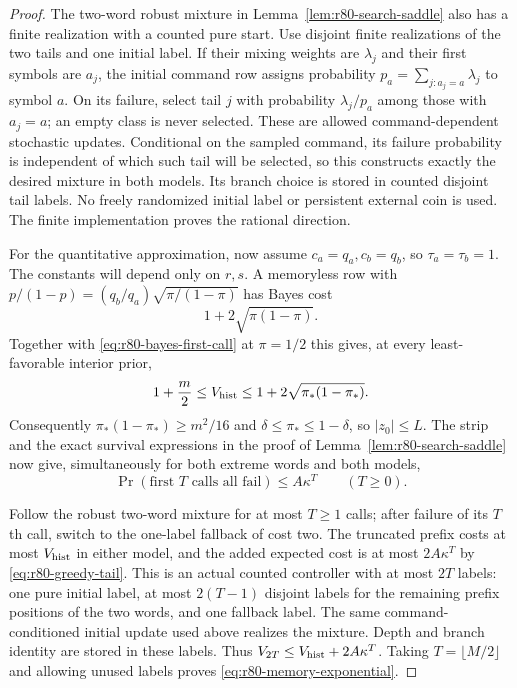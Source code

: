 \begin{proof}
The two-word robust mixture in
Lemma~\ref{lem:r80-search-saddle} also has a finite realization
with a counted pure start.  Use disjoint finite realizations of
the two tails and one initial label.  If their mixing weights
are $\lambda_j$ and their first symbols are $a_j$, the initial
command row assigns probability
$p_a=\sum_{j:a_j=a}\lambda_j$ to symbol $a$.  On its failure,
select tail $j$ with probability $\lambda_j/p_a$ among those
with $a_j=a$; an empty class is never selected.  These are
allowed command-dependent stochastic updates.  Conditional on
the sampled command, its failure probability is independent of
which such tail will be selected, so this constructs exactly
the desired mixture in both models.  Its branch choice is
stored in counted disjoint tail labels.  No freely randomized
initial label or persistent external coin is used.  The finite
implementation proves the rational direction.

For the quantitative approximation, now assume
$c_a=q_a,c_b=q_b$, so $\tau_a=\tau_b=1$.  The constants
will depend only on $r,s$.  A memoryless row with
$p/(1-p)=(q_b/q_a)\sqrt{\pi/(1-\pi)}$ has Bayes cost
\[
 1+2\sqrt{\pi(1-\pi)}.
\]
Together with \eqref{eq:r80-bayes-first-call} at $\pi=1/2$ this
gives, at every least-favorable interior prior,
\[
 1+\frac m2\le V_{\rm hist}
        \le1+2\sqrt{\pi_*(1-\pi_*)}.
\]
Consequently $\pi_*(1-\pi_*)\ge m^2/16$ and
$\delta\le\pi_*\le1-\delta$, so $|z_0|\le L$.
The strip and the exact survival expressions in the proof of
Lemma~\ref{lem:r80-search-saddle} now give, simultaneously for
both extreme words and both models,
\begin{equation}\label{eq:r80-greedy-tail}
 \Pr(\text{first }T\text{ calls all fail})
                       \le A\kappa^T\qquad(T\ge0).
\end{equation}

Follow the robust two-word mixture for at most $T\ge1$ calls;
after failure of its $T$th call, switch to the one-label fallback
of cost two.  The truncated prefix costs at most
$V_{\rm hist}$ in either model, and the added expected cost is
at most $2A\kappa^T$ by \eqref{eq:r80-greedy-tail}.  This is an
actual counted controller with at most $2T$ labels: one pure
initial label, at most $2(T-1)$ disjoint labels for the remaining
prefix positions of the two words, and one fallback label.
The same command-conditioned initial update used above realizes
the mixture.  Depth and branch identity are stored in these
labels.  Thus $V_{2T}\le V_{\rm hist}+2A\kappa^T$.
Taking $T=\lfloor M/2\rfloor$ and allowing unused labels proves
\eqref{eq:r80-memory-exponential}.
\end{proof}

